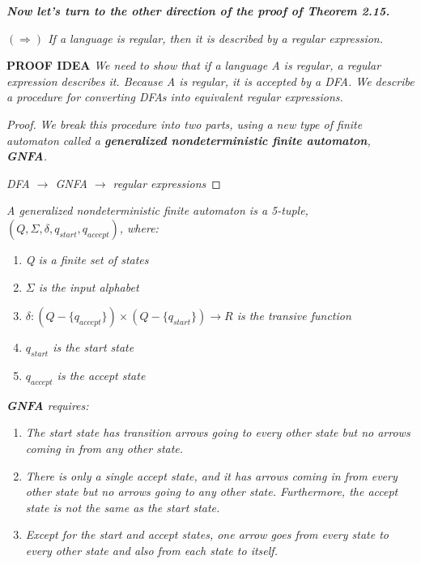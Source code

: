\documentclass{article}
\begin{document}
\textbf{\textit{Now let's turn to the other direction of the proof of Theorem 2.15.}}

\begin{lemma}
    \textit{$(\Rightarrow)$ If a language is regular, then it is described by a regular expression.}

    \textbf{PROOF IDEA} \textit{We need to show that if a language A is regular, a regular
    expression describes it. Because A is regular, it is accepted by a DFA. We describe
    a procedure for converting DFAs into equivalent regular expressions.}

    \begin{proof}
        \textit{We break this procedure into two parts, using a new type of finite automaton
        called a \textbf{generalized nondeterministic finite automaton}, \textbf{GNFA}.}

        \textit{DFA $\rightarrow$ GNFA $\rightarrow$ regular expressions}
    \end{proof}
\end{lemma}

\begin{defn}
    \textit{A generalized nondeterministic finite automaton is a 5-tuple,
    $(Q, \Sigma, \delta, q_{start}, q_{accept})$, where:}

    \begin{enumerate}
        \item \textit{Q is a finite set of states}
        \item \textit{$\Sigma$ is the input alphabet}
        \item \textit{$\delta:(Q-\{q_{accept}\})\times (Q-\{q_{start}\})\rightarrow R$ is the transive function}
        \item \textit{$q_{start}$ is the start state}
        \item \textit{$q_{accept}$ is the accept state}
    \end{enumerate}

    \begin{remark}
        \textit{\textbf{GNFA} requires:}
        \begin{enumerate}
            \item \textit{The start state has transition arrows going to every other state but no arrows
            coming in from any other state.}
            \item \textit{There is only a single accept state, and it has arrows coming in from every
            other state but no arrows going to any other state. Furthermore, the accept
            state is not the same as the start state.}
            \item \textit{Except for the start and accept states, one arrow goes from every state to
            every other state and also from each state to itself.}
        \end{enumerate}
    \end{remark}
\end{defn}
\end{document}
